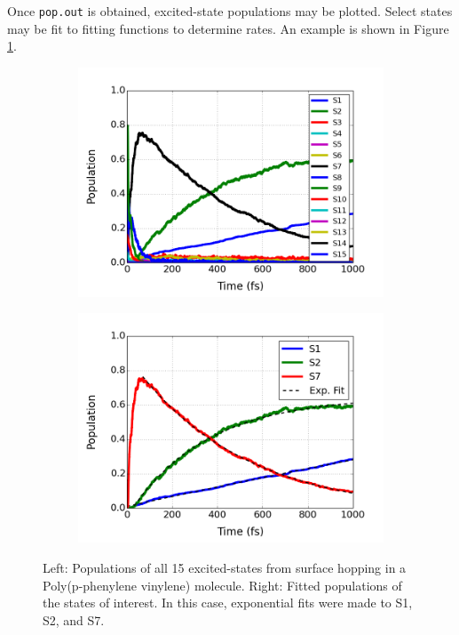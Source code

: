 \documentclass[letterpaper,12pt,titlepage]{article}
\begin{document}
Once \verb+pop.out+ is obtained, excited-state populations may be plotted.  Select states may be fit to fitting functions to determine rates.  An example is shown in Figure \ref{pop_fit}.
\begin{figure}[h]
        \centering
        \begin{subfigure}[h]{0.475\textwidth}
            \centering
            \includegraphics[scale=.4]{pop_hops_allstates.png}
        \end{subfigure}
	\hspace{3mm}
        \begin{subfigure}[h]{0.475\textwidth}  
            \centering 
            \includegraphics[scale=.4]{pop_hops_expfit.png}
        \end{subfigure}
        \caption{\small Left: Populations of all 15 excited-states from surface hopping in a Poly(p-phenylene vinylene) molecule.  Right: Fitted populations of the states of interest.  In this case, exponential fits were made to S1, S2, and S7.} 
\label{pop_fit}
\end{figure}
\end{document}
